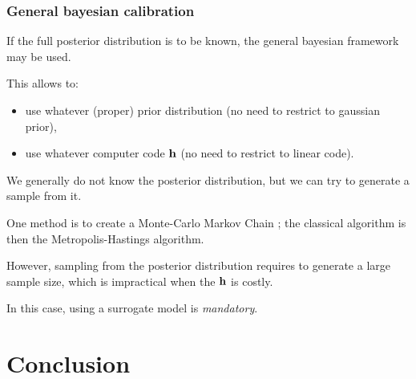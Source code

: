 \documentclass{beamer}
\begin{document}
\begin{frame}
\frametitle{General bayesian calibration}

If the full posterior distribution is to be known, the 
general bayesian framework may be used. 

This allows to:
\begin{itemize}
\item use whatever (proper) prior distribution (no need to restrict to gaussian 
prior),
\item use whatever computer code ${\bf h}$ (no need to restrict to linear 
code).
\end{itemize}

We generally do not know the posterior distribution, but we can 
try to generate a sample from it. 

One method is to create a Monte-Carlo Markov Chain ; the classical algorithm is then the 
Metropolis-Hastings algorithm. 

However, sampling from the posterior distribution 
requires to generate a large sample size, which is impractical 
when the ${\bf h}$ is costly. 

In this case, using a surrogate model is \emph{mandatory}. 

\end{frame}


\section{Conclusion}

\end{document}

